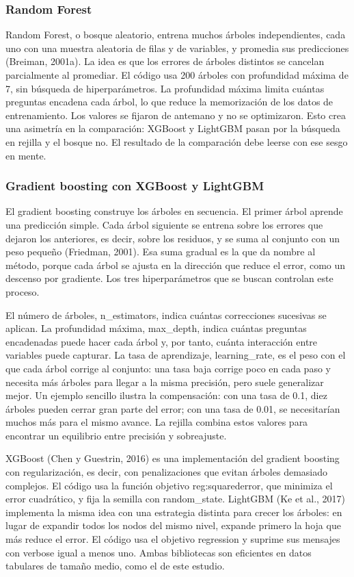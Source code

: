 \subsubsection{Random Forest}
Random Forest, o bosque aleatorio, entrena muchos árboles independientes, cada uno con una muestra aleatoria de filas y de variables, y promedia sus predicciones (Breiman, 2001a). La idea es que los errores de árboles distintos se cancelan parcialmente al promediar. El código usa 200 árboles con profundidad máxima de 7, sin búsqueda de hiperparámetros. La profundidad máxima limita cuántas preguntas encadena cada árbol, lo que reduce la memorización de los datos de entrenamiento. Los valores se fijaron de antemano y no se optimizaron. Esto crea una asimetría en la comparación: XGBoost y LightGBM pasan por la búsqueda en rejilla y el bosque no. El resultado de la comparación debe leerse con ese sesgo en mente.

\subsubsection{Gradient boosting con XGBoost y LightGBM}
El gradient boosting construye los árboles en secuencia. El primer árbol aprende una predicción simple. Cada árbol siguiente se entrena sobre los errores que dejaron los anteriores, es decir, sobre los residuos, y se suma al conjunto con un peso pequeño (Friedman, 2001). Esa suma gradual es la que da nombre al método, porque cada árbol se ajusta en la dirección que reduce el error, como un descenso por gradiente. Los tres hiperparámetros que se buscan controlan este proceso.

El número de árboles, n\_estimators, indica cuántas correcciones sucesivas se aplican. La profundidad máxima, max\_depth, indica cuántas preguntas encadenadas puede hacer cada árbol y, por tanto, cuánta interacción entre variables puede capturar. La tasa de aprendizaje, learning\_rate, es el peso con el que cada árbol corrige al conjunto: una tasa baja corrige poco en cada paso y necesita más árboles para llegar a la misma precisión, pero suele generalizar mejor. Un ejemplo sencillo ilustra la compensación: con una tasa de 0.1, diez árboles pueden cerrar gran parte del error; con una tasa de 0.01, se necesitarían muchos más para el mismo avance. La rejilla combina estos valores para encontrar un equilibrio entre precisión y sobreajuste.

XGBoost (Chen y Guestrin, 2016) es una implementación del gradient boosting con regularización, es decir, con penalizaciones que evitan árboles demasiado complejos. El código usa la función objetivo reg:squarederror, que minimiza el error cuadrático, y fija la semilla con random\_state. LightGBM (Ke et al., 2017) implementa la misma idea con una estrategia distinta para crecer los árboles: en lugar de expandir todos los nodos del mismo nivel, expande primero la hoja que más reduce el error. El código usa el objetivo regression y suprime sus mensajes con verbose igual a menos uno. Ambas bibliotecas son eficientes en datos tabulares de tamaño medio, como el de este estudio.

